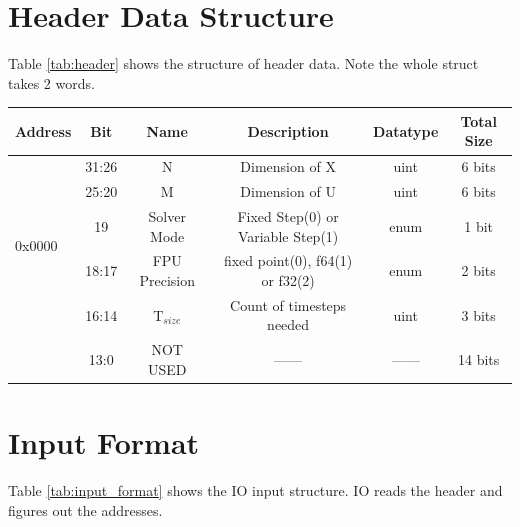 \documentclass[12pt]{report}
\begin{document}
\section{Header Data Structure}
Table \ref{tab:header} shows the structure of header data. Note the whole struct takes 2 words.
\begin{center}
 \begin{tabular}{||l |c |c| c| c| c||} 
 \hline
 Address & Bit & Name & Description & Datatype & Total Size \\ [0.5ex] 
 \hline\hline
 \multirow{5}{*}{0x0000} & 31:26 & N & Dimension of X  & uint & 6 bits  \\ 
 \cline{2-6}
 & 25:20 & M & Dimension of U  & uint & 6 bits  \\ 
 \cline{2-6}
 & 19 & Solver Mode & Fixed Step(0) or Variable Step(1)  & enum & 1 bit \\ 
 \cline{2-6}
 & 18:17 & FPU Precision & fixed point(0), f64(1) or f32(2) & enum & 2 bits  \\ 
 \cline{2-6}
 & 16:14 & T$_{size}$ & Count of timesteps needed & uint & 3 bits \\ 
 & 13:0 & NOT USED &  ------ & ------ & 14 bits \\
 \hline
 
\end{tabular}
\end{center}

\section{Input Format}
Table \ref{tab:input_format} shows the IO input structure. IO reads the header and figures out the addresses.
\end{document}
